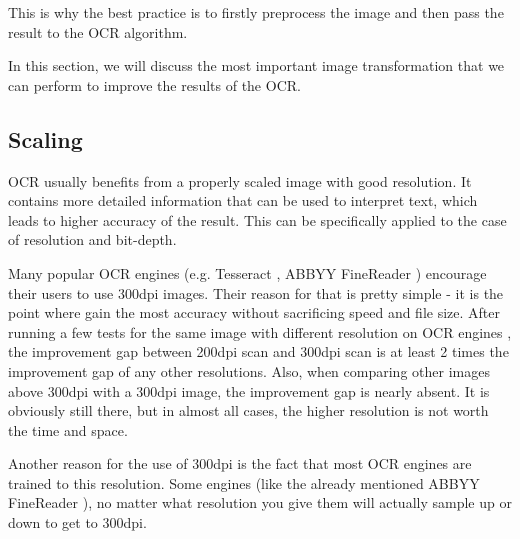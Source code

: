 This is why the best practice is to firstly preprocess the image and then pass the result to the OCR algorithm.

In this section, we will discuss the most important image transformation that we can perform to improve the results of the OCR. 

\subsection{Scaling}

OCR usually benefits from a properly scaled image with good resolution. It contains more detailed information that can be used to interpret text, which leads to higher accuracy of the result. This can be specifically applied to the case of resolution and bit-depth.

Many popular OCR engines (e.g. Tesseract \citep{TesseractQual}, ABBYY FineReader \citep{ABBYYdpi}) encourage their users to use  300dpi images. Their reason for that is pretty simple - it is the point where  gain the most accuracy without sacrificing speed and file size. After running a few tests for the same image with different resolution on OCR engines \citep{preprocessAll}, the improvement gap between 200dpi scan and 300dpi scan is at least 2 times the improvement gap of any other resolutions. Also, when comparing other images above 300dpi with a 300dpi image, the improvement gap is nearly absent. It is obviously still there, but in almost all cases, the higher resolution is not worth the time and space. 

Another reason for the use of 300dpi is the fact that most OCR engines are trained to this resolution. Some engines (like the already mentioned ABBYY FineReader \citep{ABBYYdpi}), no matter what resolution you give them will actually sample up or down to get to 300dpi. 

